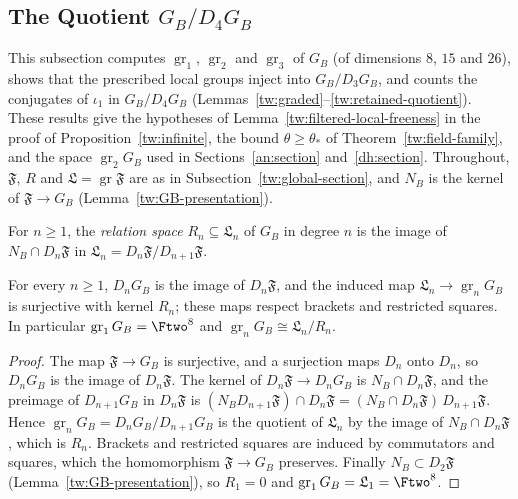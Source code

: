 \subsection{\texorpdfstring{The Quotient $G_B/D_4G_B$}{The Quotient G\_B/D\_4G\_B}}\label{tw:retained-section}
This subsection computes $\operatorname{gr}_1$, $\operatorname{gr}_2$ and
$\operatorname{gr}_3$ of $G_B$ (of dimensions $8$, $15$ and $26$), shows that
the prescribed local groups inject into $G_B/D_3G_B$, and counts the
conjugates of $\iota_1$ in $G_B/D_4G_B$
(Lemmas~\ref{tw:graded}--\ref{tw:retained-quotient}). These results give
the hypotheses of Lemma~\ref{tw:filtered-local-freeness} in the proof of
Proposition~\ref{tw:infinite}, the bound $\theta\ge\theta_*$ of
Theorem~\ref{tw:field-family}, and the space $\operatorname{gr}_2G_B$ used in
Sections~\ref{an:section} and~\ref{dh:section}. Throughout, $\mathfrak F$,
$R$ and $\mathfrak L=\operatorname{gr}\mathfrak F$ are as in
Subsection~\ref{tw:global-section}, and $N_B$ is the kernel of
$\mathfrak F\to G_B$ (Lemma~\ref{tw:GB-presentation}).

\begin{definition}\label{tw:relation-space}
For $n\ge1$, the \emph{relation space} $R_n\subseteq\mathfrak L_n$ of $G_B$
in degree $n$ is the image of $N_B\cap D_n\mathfrak F$ in
$\mathfrak L_n=D_n\mathfrak F/D_{n+1}\mathfrak F$.
\end{definition}

\begin{lemma}\label{tw:graded}
For every $n\ge1$, $D_nG_B$ is the image of $D_n\mathfrak F$, and the induced
map $\mathfrak L_n\to\operatorname{gr}_nG_B$ is surjective with kernel $R_n$;
these maps respect brackets and restricted squares. In particular
$\operatorname{gr}_1G_B=\Ftwo^8$ and
$\operatorname{gr}_nG_B\cong\mathfrak L_n/R_n$.
\end{lemma}

\begin{proof}
The map $\mathfrak F\to G_B$ is surjective, and a surjection maps $D_n$ onto
$D_n$, so $D_nG_B$ is the image of $D_n\mathfrak F$. The kernel of
$D_n\mathfrak F\to D_nG_B$ is $N_B\cap D_n\mathfrak F$, and the preimage of
$D_{n+1}G_B$ in $D_n\mathfrak F$ is
$(N_BD_{n+1}\mathfrak F)\cap D_n\mathfrak F=(N_B\cap D_n\mathfrak F)\,D_{n+1}\mathfrak F$.
Hence $\operatorname{gr}_nG_B=D_nG_B/D_{n+1}G_B$ is the quotient of
$\mathfrak L_n$ by the image of $N_B\cap D_n\mathfrak F$, which is $R_n$.
Brackets and restricted squares are induced by commutators and squares, which
the homomorphism $\mathfrak F\to G_B$ preserves. Finally
$N_B\subset D_2\mathfrak F$ (Lemma~\ref{tw:GB-presentation}), so $R_1=0$ and
$\operatorname{gr}_1G_B=\mathfrak L_1=\Ftwo^8$.
\end{proof}

